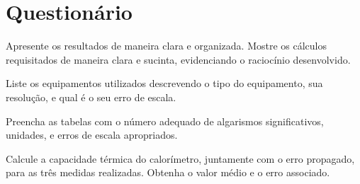 \vspace{15mm}

\begin{fullwidth}
\noindent{}
\vspace{5mm}

\noindent{}

\noindent{}

\noindent{}

\noindent{}

\noindent{}
\end{fullwidth}

\vspace{5mm}

\section{Questionário}

\begin{question}[type={exam}]{1}
Apresente os resultados de maneira clara e organizada. Mostre os cálculos requisitados de maneira clara e sucinta, evidenciando o raciocínio desenvolvido.
\end{question}

\begin{question}[type={exam}]{1}
Liste os equipamentos utilizados descrevendo o tipo do equipamento, sua resolução, e qual é o seu erro de escala.
\end{question}

\begin{question}[type={exam}]{2}
Preencha as tabelas com o número adequado de algarismos significativos, unidades, e erros de escala apropriados. 
\end{question}

\begin{question}[type={exam}]{2}
Calcule a capacidade térmica do calorímetro, juntamente com o erro propagado, para as três medidas realizadas. Obtenha o valor médio e o erro associado.
\end{question}


